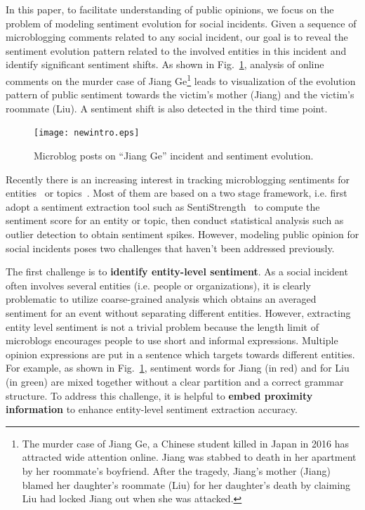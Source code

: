 \documentclass[runningheads]{llncs}
\begin{document}
In this paper, to facilitate understanding of public opinions, we focus on the problem of modeling sentiment evolution for social incidents. 
Given a sequence of microblogging comments related to any social incident, our goal is to reveal the sentiment evolution pattern related to the involved entities in this incident and identify significant sentiment shifts. 
As shown in Fig.~\ref{fig:tweet}, analysis of online comments on the murder case of Jiang Ge\footnote{The murder case of Jiang Ge, a Chinese student killed in Japan in 2016 has attracted wide attention online. Jiang was stabbed to death in her apartment by her roommate's boyfriend. After the tragedy, Jiang's mother (Jiang) blamed her daughter's roommate (Liu) for her daughter's death by claiming Liu had locked Jiang out when she was attacked.} leads to visualization of the evolution pattern of public sentiment towards the victim's mother (Jiang) and the victim's roommate (Liu). A sentiment shift is also detected in the third time point. %

\begin{figure}
\begin{center}
    \centering
    \texttt{[image: newintro.eps]}
    \setlength{\abovecaptionskip}{-0.1cm}
    \caption{Microblog posts on ``Jiang Ge'' incident and sentiment evolution.}\label{fig:tweet}
\end{center}
\end{figure}

Recently there is an increasing interest in tracking microblogging sentiments for entities~\cite{Giachanou2016sentichange,Giachanou2017sentichange} or topics~\cite{Tsytsarau2014Topics,Thelwall2011topic}. Most of them are based on a two stage framework, i.e. first adopt a sentiment extraction tool such as SentiStrength~\cite{sentistrength2010} to compute the sentiment score for an entity or topic, then conduct statistical analysis such as outlier detection to obtain sentiment spikes. However, modeling public opinion for social incidents poses two challenges that haven't been addressed previously.

The first challenge is to \textbf{identify entity-level sentiment}. 
As a social incident often involves several entities (i.e. people or organizations), it is clearly problematic to utilize coarse-grained analysis which obtains an averaged sentiment for an event without separating different entities. %
However, extracting entity level sentiment is not a trivial problem because the length limit of microblogs encourages people to use short and informal expressions.
Multiple opinion expressions are put in a sentence which targets towards different entities.
For example, as shown in Fig.~\ref{fig:tweet}, sentiment words for Jiang (in red) and for Liu (in green) are mixed together without a clear partition and a correct grammar structure. 
To address this challenge, it is helpful to \textbf{embed proximity information} to enhance entity-level sentiment extraction accuracy. 
\end{document}
